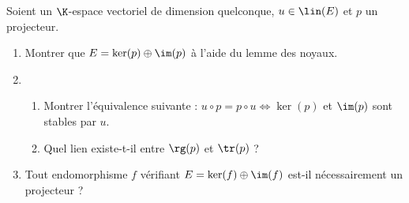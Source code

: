 \begin{enonce}
\begin{exercise}[ID={RMS135 E1410},subtitle={CCINP MP 2024},tags={},difficulty={}]
Soient un $\K$-espace vectoriel de dimension quelconque, $u \in \lin(E)$ et $p$ un projecteur.
\begin{enumerate}
  \item Montrer que $E = \ker(p) \oplus \im(p)$ à l’aide du lemme des noyaux.
  \item 
  \begin{enumerate}
    \item Montrer l’équivalence suivante : $u \circ p = p \circ u \iff \ker(p)$ et $\im(p)$ sont stables par $u$.
    \item Quel lien existe-t-il entre $\rg(p)$ et $\tr(p)$ ?
  \end{enumerate}
  \item Tout endomorphisme $f$ vérifiant $E = \ker(f) \oplus \im(f)$ est-il nécessairement un projecteur ?
\end{enumerate}
\end{exercise}
\begin{solution}
\end{solution}
\end{enonce}
